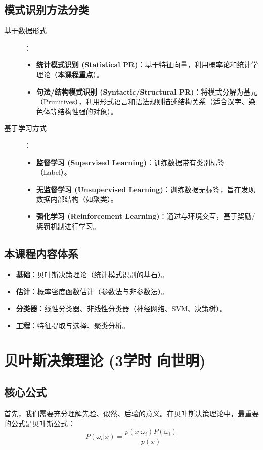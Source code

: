\documentclass[a4paper, 11pt]{ctexart}
\begin{document}
\subsection{模式识别方法分类}
\begin{description}
    \item[基于数据形式]：
    \begin{itemize}
        \item \textbf{统计模式识别 (Statistical PR)}：基于特征向量，利用概率论和统计学理论（\textbf{本课程重点}）。
        \item \textbf{句法/结构模式识别 (Syntactic/Structural PR)}：将模式分解为基元（Primitives），利用形式语言和语法规则描述结构关系（适合汉字、染色体等结构性强的对象）。
    \end{itemize}
    \item[基于学习方式]：
    \begin{itemize}
        \item \textbf{监督学习 (Supervised Learning)}：训练数据带有类别标签（Label）。
        \item \textbf{无监督学习 (Unsupervised Learning)}：训练数据无标签，旨在发现数据内部结构（如聚类）。
        \item \textbf{强化学习 (Reinforcement Learning)}：通过与环境交互，基于奖励/惩罚机制进行学习。
    \end{itemize}
\end{description}

\subsection{本课程内容体系}
\begin{itemize}
    \item \textbf{基础}：贝叶斯决策理论（统计模式识别的基石）。
    \item \textbf{估计}：概率密度函数估计（参数法与非参数法）。
    \item \textbf{分类器}：线性分类器、非线性分类器（神经网络、SVM、决策树）。
    \item \textbf{工程}：特征提取与选择、聚类分析。
\end{itemize}

\newpage
\section{贝叶斯决策理论 \small{(3学时 向世明)}}

\subsection{核心公式}
首先，我们需要充分理解先验、似然、后验的意义。在贝叶斯决策理论中，最重要的公式是贝叶斯公式：
\begin{equation}
    P(\omega_i|x) = \frac{p(x|\omega_i)P(\omega_i)}{p(x)}
\end{equation}
\end{document}
